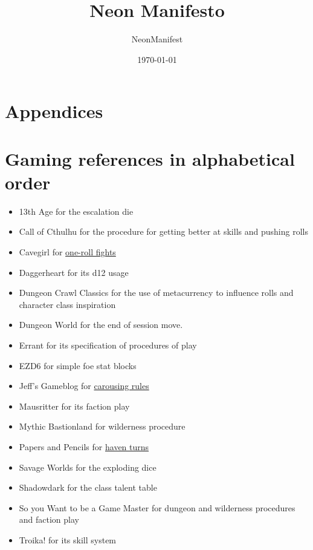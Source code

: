 \documentclass{article}
\title{Neon Manifesto}
\author{NeonManifest}
\date{\today}
\begin{document}
\maketitle

\tableofcontents









\appendix
\section*{Appendices}
\section{Gaming references in alphabetical order}
\begin{itemize}
    \item 13th Age for the escalation die
    \item Call of Cthulhu for the procedure for getting better at skills and pushing rolls
    \item Cavegirl for \href{https://cavegirlgames.blogspot.com/2018/03/one-roll-fights.html}{one-roll fights}
    \item Daggerheart for its d12 usage
    \item Dungeon Crawl Classics for the use of metacurrency to influence rolls and character 
          class inspiration
    \item Dungeon World for the end of session move.
    \item Errant for its specification of procedures of play
    \item EZD6 for simple foe stat blocks
    \item Jeff's Gameblog for \href{https://jrients.blogspot.com/2008/12/party-like-its-999.html}{carousing rules}
    \item Mausritter for its faction play
    \item Mythic Bastionland for wilderness procedure
    \item Papers and Pencils for \href{https://www.paperspencils.com/the-haven-turn/}{haven turns}
    \item Savage Worlds for the exploding dice
    \item Shadowdark for the class talent table
    \item So you Want to be a Game Master for dungeon and wilderness procedures and faction play
    \item Troika! for its skill system
\end{itemize}
\end{document}
